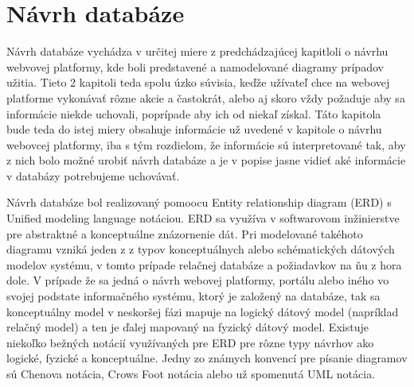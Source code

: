\section{Návrh databáze}
Návrh databáze vychádza v určitej miere z predchádzajúcej kapitloli o návrhu webvovej platformy, kde boli predstavené a namodelované diagramy prípadov užitia. Tieto 2 kapitoli teda spolu úzko súvisia, keďže užívateľ chce na webovej platforme vykonávať rôzne akcie a častokrát, alebo aj skoro vždy požaduje aby sa informácie niekde uchovali, poprípade aby ich od niekaľ získal. Táto kapitola bude teda do istej miery obsahuje informácie už uvedené v kapitole o návrhu webovcej platformy, iba s tým rozdielom, že informácie sú interpretované tak, aby z nich bolo možné urobiť návrh databáze a je v popise jasne vidieť aké informácie v databázy potrebujeme uchovávať.

Návrh databáze bol realizovaný pomoocu Entity relationship diagram (ERD) s Unified modeling language notáciou. ERD sa využíva v softwarovom inžinierstve pre abstraktné a konceptuálne znázornenie dát. Pri modelované takéhoto diagramu vzniká jeden z z typov konceptuálnych alebo schématických dátových modelov systému, v tomto prípade relačnej databáze a požiadavkov na ňu z hora dole. V prípade že sa jedná o návrh webovej platformy, portálu alebo iného vo svojej podstate informačného systému, ktorý je založený na databáze, tak sa konceptuálny model v neskoršej fázi mapuje na logický dátový model (napríklad relačný model) a ten je ďalej mapovaný na fyzický dátový model. Existuje niekoľko bežných notácií využívaných pre ERD pre rôzne typy návrhov ako logické, fyzické a konceptuálne. Jedny zo známych konvencí pre písanie diagramov sú Chenova notácia, Crows Foot notácia alebo už spomenutá UML notácia. 

